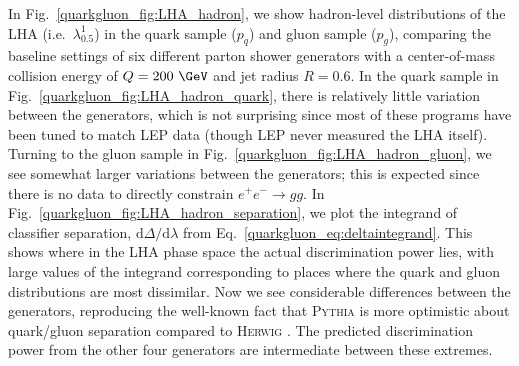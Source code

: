 \documentclass[11pt]{cernrep}
\begin{document}
In Fig.~\ref{quarkgluon_fig:LHA_hadron}, we show hadron-level distributions of the LHA (i.e.~$\lambda_{0.5}^1$) in the quark sample ($p_q$) and gluon sample ($p_g$), comparing the baseline settings of six different parton shower generators with a center-of-mass collision energy of $Q = 200~\GeV$ and jet radius $R = 0.6$. In the quark sample in Fig.~\ref{quarkgluon_fig:LHA_hadron_quark}, there is relatively little variation between the generators, which is not surprising since most of these programs have been tuned to match LEP data (though LEP never measured the LHA itself).  Turning to the gluon sample in Fig.~\ref{quarkgluon_fig:LHA_hadron_gluon}, we see somewhat larger variations between the generators; this is expected since there is no data to directly constrain $e^+ e^- \to gg$.  In Fig.~\ref{quarkgluon_fig:LHA_hadron_separation}, we plot the integrand of classifier separation, $\text{d} \Delta / \text{d} \lambda$ from Eq.~\eqref{quarkgluon_eq:deltaintegrand}. This shows where in the LHA phase space the actual discrimination power lies, with large values of the integrand
corresponding to places where the quark and gluon distributions are
most dissimilar.  Now we see considerable differences between the
generators, reproducing the well-known fact that \textsc{Pythia} is
more optimistic about quark/gluon separation compared to
\textsc{Herwig} \cite{Aad:2014gea}.  The predicted discrimination power from the other four generators are intermediate between these
extremes.
\end{document}
